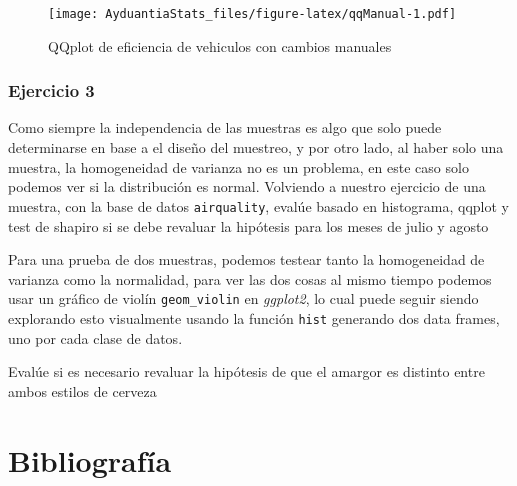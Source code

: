\documentclass[]{book}
\begin{document}
\begin{figure}
\centering
\texttt{[image: AyduantiaStats\_files/figure-latex/qqManual-1.pdf]}
\caption{\label{fig:qqManual}QQplot de eficiencia de vehiculos con cambios manuales}
\end{figure}

\hypertarget{ejercicio-3}{%
\subsubsection{Ejercicio 3}\label{ejercicio-3}}

Como siempre la independencia de las muestras es algo que solo puede determinarse en base a el diseño del muestreo, y por otro lado, al haber solo una muestra, la homogeneidad de varianza no es un problema, en este caso solo podemos ver si la distribución es normal. Volviendo a nuestro ejercicio de una muestra, con la base de datos \texttt{airquality}, evalúe basado en histograma, qqplot y test de shapiro si se debe revaluar la hipótesis para los meses de julio y agosto

Para una prueba de dos muestras, podemos testear tanto la homogeneidad de varianza como la normalidad, para ver las dos cosas al mismo tiempo podemos usar un gráfico de violín \texttt{geom\_violin} en \emph{ggplot2}, lo cual puede seguir siendo explorando esto visualmente usando la función \texttt{hist} generando dos data frames, uno por cada clase de datos.

Evalúe si es necesario revaluar la hipótesis de que el amargor es distinto entre ambos estilos de cerveza

\hypertarget{bibliografia}{%
\section{Bibliografía}\label{bibliografia}}


\end{document}
